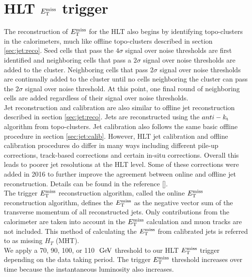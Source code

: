 \section{HLT $E_{\mathrm{T}}^{\mathrm{miss}}$ trigger}
\label{sec:trig:HLT_MET}

\indent The reconstruction of $E_{\mathrm{T}}^{\mathrm{miss}}$ for the HLT also begins by identifying topo-clusters in the calorimeters, much like offline topo-clusters described in section \ref{sec:jet:reco}.  Seed cells that pass the $4\sigma$ signal over noise thresholds are first identified and neighboring cells that pass a $2\sigma$ signal over noise thresholds are added to the cluster.  Neighboring cells that pass $2\sigma$ signal over noise thresholds are continually added to the cluster until no cells neighboring the cluster can pass the $2\sigma$ signal over noise threshold.  At this point, one final round of neighboring cells are added regardless of their signal over noise thresholds. \\

\indent Jet reconstruction and calibration are also similar to offline jet reconstruction described in section \ref{sec:jet:reco}.  Jets are reconstructed using the $anti-k_{\rm{t}}$ algorithm from topo-clusters.\cite{jetReco7TeV}  Jet calibration also follows the same basic offline procedure in section \ref{sec:jet:calib}. However, HLT jet calibration and offline calibration procedures do differ in many ways including different pile-up corrections, track-based corrections and certain in-situ corrections.  Overall this leads to poorer jet resolutions at the HLT level.  Some of these corrections were added in 2016 to further improve the agreement between online and offline jet reconstruction.  Details can be found in the reference [\cite{Trigger2016}]. \\

\indent The trigger $E_{\mathrm{T}}^{\mathrm{miss}}$ reconstruction algorithm, called the online $E_{\mathrm{T}}^{\mathrm{miss}}$ reconstruction algorithm, defines the $E_{\mathrm{T}}^{\mathrm{miss}}$ as the negative vector sum of the transverse momentum of all reconstructed jets.   Only contributions from the calorimeter are taken into account in the $E_{\mathrm{T}}^{\mathrm{miss}}$ calculation and muon tracks are not included.  This method of calculating the $E_{\mathrm{T}}^{\mathrm{miss}}$ from calibrated jets is referred to as missing $H_T$ (MHT).  \\

\indent We apply a 70, 90, 100, or 110 $\gev$ threshold to our HLT $E_{\mathrm{T}}^{\mathrm{miss}}$ trigger depending on the data taking period.  The trigger $E_{\mathrm{T}}^{\mathrm{miss}}$ threshold increases over time because the instantaneous luminosity also increases. \\

